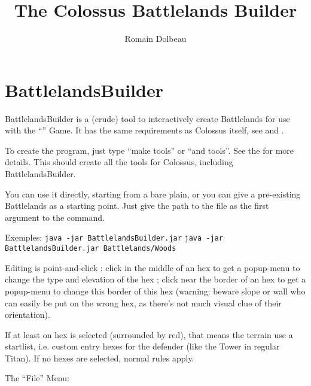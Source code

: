 \documentclass{article}
\begin{document}

\title{The Colossus Battlelands Builder}

\author{Romain Dolbeau}

\maketitle

\section{BattlelandsBuilder}

BattlelandsBuilder is a (crude) tool to interactively
create Battlelands for use with the
``'' Game.
It has the same requirements as Colossus itself, see
and
.

To create the program, just type ``make tools'' or ``and tools''.
See the
for more details.
This should create all the tools for Colossus, including
BattlelandsBuilder.

You can use it directly, starting from a bare plain,
or you can give a pre-existing Battlelands as a
starting point. Just give the path to the file as
the first argument to the command.

Exemples:
\texttt{java -jar BattlelandsBuilder.jar}
\texttt{java -jar BattlelandsBuilder.jar Battlelands/Woods}

Editing is point-and-click : click in the middle
of an hex to get a popup-menu to change the type
and elevation of the hex ; click near the border of
an hex to get a popup-menu to change this border of
this hex (warning: beware slope or wall who can
easily be put on the wrong hex, as there's not much
visual clue of their orientation).

If at least on hex is selected (surrounded by red),
that means the terrain use a startlist, i.e. custom
entry hexes for the defender (like the Tower in regular
Titan). If no hexes are selected, normal rules apply.

The ``File'' Menu:
\end{document}
